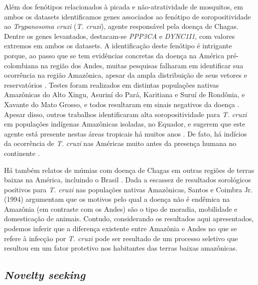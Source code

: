 Além dos fenótipos relacionados à picada e não-atratividade de mosquitos, em ambos os datasets identificamos genes associados ao fenótipo de soropositividade ao \textit{Trypanosoma cruzi} (\textit{T. cruzi}), agente responsável pela doença de Chagas. Dentre os genes levantados, destacam-se \textsl{PPP3CA} e \textsl{DYNC1I1}, com valores extremos em ambos os datasets. A identificação deste fenótipo é intrigante porque, ao passo que se tem evidências concretas da doença na América pré-colombiana na região dos Andes, muitas pesquisas falharam em identificar sua ocorrência na região Amazônica, apesar da ampla distribuição de seus vetores e reservatórios \cite{coimbra_jr_human_1988,aguilar_chagas_2007}. Testes foram realizados em distintas populações nativas Amazônicas do Alto Xingu, Asuriní do Pará, Karitiana e Suruí de Rondônia, e Xavante do Mato Grosso, e todos resultaram em sinais negativos da doença \cite{santos_saude_1994}. Apesar disso, outros trabalhos identificaram alta soropositividade para \textit{T. cruzi} em populações indígenas Amazônicas isoladas, no Equador, e sugerem que este agente está presente nestas áreas tropicais há muitos anos \cite{chico_chagas_1997}. De fato, há indícios da ocorrência de \textit{T. cruzi} nas Américas muito antes da presença humana no continente \cite{zeledon_chagas_1981}.

Há também relatos de múmias com doença de Chagas em outras regiões de terras baixas na América, incluindo o Brasil \cite{araujo_paleoparasitology_2009}. Dada a escassez de resultados sorológicos positivos para \textit{T. cruzi} nas populações nativas Amazônicas, Santos e Coimbra Jr. (1994) argumentam que os motivos pelo qual a doença não é endêmica na Amazônia (em contraste com os Andes) são o tipo de moradia, mobilidade e domesticação de animais. Contudo, considerando os resultados aqui apresentados, podemos inferir que a diferença existente entre Amazônia e Andes no que se refere à infecção por \textit{T. cruzi} pode ser resultado de um processo seletivo que resultou em um fator protetivo nos habitantes das terras baixas amazônicas. 

\subsection{\textit{Novelty seeking}}

